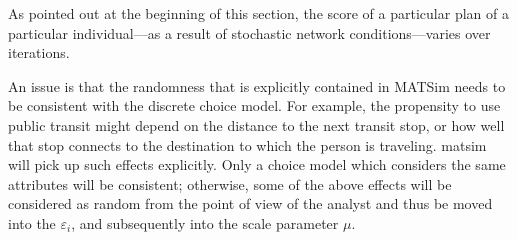 


As pointed out at the beginning of this section, the score of a particular plan of a particular individual---as a result of stochastic network conditions---varies over iterations. 

An issue is that the randomness that is explicitly contained in MATSim needs to be consistent with the discrete choice model.
%
For example, the propensity to use public transit might depend on the distance to the next transit stop, or how well that stop connects to the destination to which the person is traveling.  \acrshort{matsim} will pick up such effects explicitly.  Only a choice model which considers the same attributes will be consistent; otherwise, some of the above effects will be considered as random from the point of view of the analyst and thus be moved into the $\varepsilon_i$, and subsequently into the scale parameter $\mu$.

